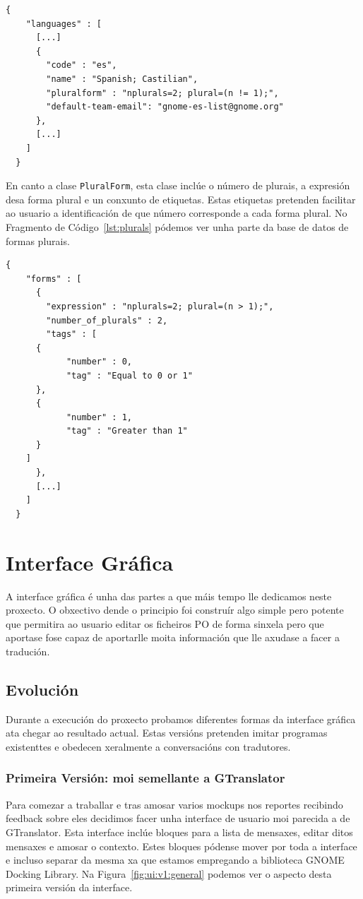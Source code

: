 \begin{lstlisting}[label=lst:languages,caption=Fragmento da Base de Datos de Linguaxes]
  {
    "languages" : [
      [...]
      {
        "code" : "es",
        "name" : "Spanish; Castilian",
        "pluralform" : "nplurals=2; plural=(n != 1);",
        "default-team-email": "gnome-es-list@gnome.org"
      },
      [...]
    ]
  }
\end{lstlisting}

En canto a clase \lstinline{PluralForm}, esta clase inclúe o número de plurais, a expresión desa forma plural e un conxunto de etiquetas. Estas etiquetas pretenden facilitar ao usuario a identificación de que número corresponde a cada forma plural. No Fragmento de Código~\ref{lst:plurals} pódemos ver unha parte da base de datos de formas plurais.

\begin{lstlisting}[label=lst:plurals,caption=Fragmento da Base de Datos de Plurais]
  {
    "forms" : [
      {
        "expression" : "nplurals=2; plural=(n > 1);",
        "number_of_plurals" : 2,
        "tags" : [
	  {
            "number" : 0,
            "tag" : "Equal to 0 or 1"
	  },
	  {
            "number" : 1,
            "tag" : "Greater than 1"
	  }
	]
      },
      [...]
    ]
  }
\end{lstlisting}

\section{Interface Gráfica}
A interface gráfica é unha das partes a que máis tempo lle dedicamos neste proxecto. O obxectivo dende o principio foi construír algo simple pero potente que permitira ao usuario editar os ficheiros PO de forma sinxela pero que aportase fose capaz de aportarlle moita información que lle axudase a facer a tradución.

\subsection{Evolución}
Durante a execución do proxecto probamos diferentes formas da interface gráfica ata chegar ao resultado actual. Estas versións pretenden imitar programas existenttes e obedecen xeralmente a conversacións con tradutores.

\subsubsection{Primeira Versión: moi semellante a GTranslator}
Para comezar a traballar e tras amosar varios mockups nos reportes recibindo feedback sobre eles decidimos facer unha interface de usuario moi parecida a de GTranslator. Esta interface inclúe bloques para a lista de mensaxes, editar ditos mensaxes e amosar o contexto. Estes bloques pódense mover por toda a interface e incluso separar da mesma xa que estamos empregando a biblioteca GNOME Docking Library. Na Figura~\ref{fig:ui:v1:general} podemos ver o aspecto desta primeira versión da interface.

